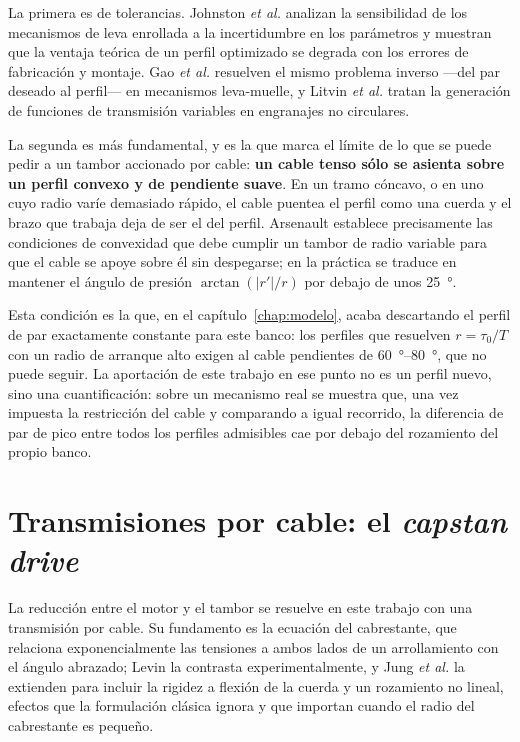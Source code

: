 La primera es de tolerancias. Johnston \emph{et al.} \cite{johnston2023} analizan la sensibilidad de
los mecanismos de leva enrollada a la incertidumbre en los parámetros y muestran que la ventaja
teórica de un perfil optimizado se degrada con los errores de fabricación y montaje. Gao \emph{et
al.} \cite{gao2018} resuelven el mismo problema inverso ---del par deseado al perfil--- en
mecanismos leva-muelle, y Litvin \emph{et al.} \cite{litvin2008} tratan la generación de funciones
de transmisión variables en engranajes no circulares.

La segunda es más fundamental, y es la que marca el límite de lo que se puede pedir a un tambor
accionado por cable: \textbf{un cable tenso sólo se asienta sobre un perfil convexo y de pendiente
suave}. En un tramo cóncavo, o en uno cuyo radio varíe demasiado rápido, el cable puentea el perfil
como una cuerda y el brazo que trabaja deja de ser el del perfil. Arsenault \cite{arsenault2018}
establece precisamente las condiciones de convexidad que debe cumplir un tambor de radio variable
para que el cable se apoye sobre él sin despegarse; en la práctica se traduce en mantener el ángulo
de presión $\arctan(|r'|/r)$ por debajo de unos \SI{25}{\degree}.

Esta condición es la que, en el capítulo~\ref{chap:modelo}, acaba descartando el perfil de par
exactamente constante para este banco: los perfiles que resuelven $r = \tau_0/T$ con un radio de
arranque alto exigen al cable pendientes de \SIrange{60}{80}{\degree}, que no puede seguir. La
aportación de este trabajo en ese punto no es un perfil nuevo, sino una cuantificación: sobre un
mecanismo real se muestra que, una vez impuesta la restricción del cable y comparando a igual
recorrido, la diferencia de par de pico entre todos los perfiles admisibles cae por debajo del
rozamiento del propio banco.

\section{Transmisiones por cable: el \emph{capstan drive}}
\label{sec:arte-capstan}

La reducción entre el motor y el tambor se resuelve en este trabajo con una transmisión por cable.
Su fundamento es la ecuación del cabrestante, que relaciona exponencialmente las tensiones a ambos
lados de un arrollamiento con el ángulo abrazado; Levin \cite{levin1991} la contrasta
experimentalmente, y Jung \emph{et al.} \cite{jung2008} la extienden para incluir la rigidez a
flexión de la cuerda y un rozamiento no lineal, efectos que la formulación clásica ignora y que
importan cuando el radio del cabrestante es pequeño.


